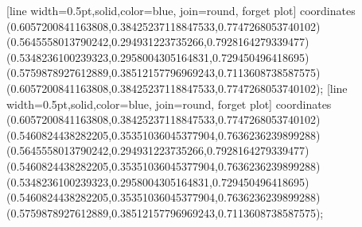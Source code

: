 [line width=0.5pt,solid,color=blue, join=round, forget plot] coordinates {(0.6057200841163808,0.38425237118847533,0.7747268053740102) (0.5645558013790242,0.294931223735266,0.7928164279339477) (0.5348236100239323,0.2958004305164831,0.729450496418695) (0.5759878927612889,0.38512157796969243,0.7113608738587575) (0.6057200841163808,0.38425237118847533,0.7747268053740102)};
[line width=0.5pt,solid,color=blue, join=round, forget plot] coordinates {(0.6057200841163808,0.38425237118847533,0.7747268053740102) (0.5460824438282205,0.35351036045377904,0.7636236239899288) (0.5645558013790242,0.294931223735266,0.7928164279339477) (0.5460824438282205,0.35351036045377904,0.7636236239899288) (0.5348236100239323,0.2958004305164831,0.729450496418695) (0.5460824438282205,0.35351036045377904,0.7636236239899288) (0.5759878927612889,0.38512157796969243,0.7113608738587575)};

